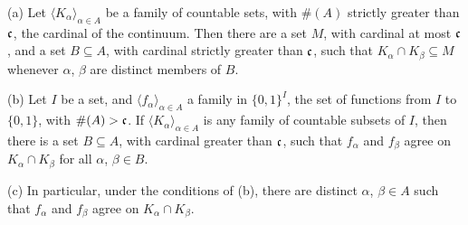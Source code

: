       
      
 (a) Let 
$\langle K_{\alpha}\rangle_{\alpha\in A}$ be 
a family of countable sets, with $\#(A)$ strictly greater than 
$\frak c$, the cardinal of the continuum.   Then there are a set $M$, with cardinal at 
most $\frak c$, and a set $B\subseteq A$, with cardinal strictly greater 
than $\frak c$, such that $K_{\alpha}\cap K_{\beta}\subseteq M$ whenever 
$\alpha$, $\beta$ are distinct members of $B$. 
      
(b) Let $I$ be a set, and 
$\langle f_{\alpha}\rangle_{\alpha\in A}$ a family in $\{0,1\}^I$, the set of functions from $I$ to $\{0,1\}$, with $\#(A)>\frak c$.    If $\langle K_{\alpha}\rangle_{\alpha\in A}$ is any family of countable subsets of 
$I$, then there is a set $B\subseteq A$, with cardinal greater than 
$\frak c$, such that $f_{\alpha}$ and $f_{\beta}$ agree on 
$K_{\alpha}\cap K_{\beta}$ for all $\alpha$, $\beta\in B$. 
      
(c) In particular, under the conditions of (b), there are distinct 
$\alpha$, $\beta\in A$ such that $f_{\alpha}$ and $f_{\beta}$ agree on 
$K_{\alpha}\cap K_{\beta}$. 
      
